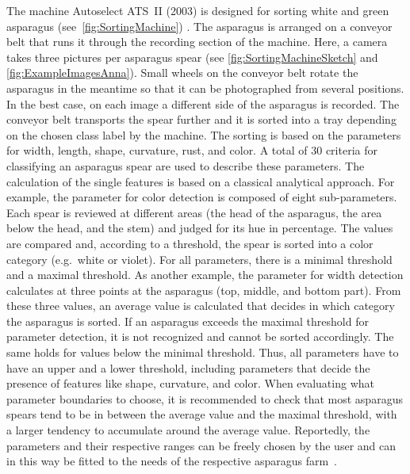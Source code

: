 The machine Autoselect ATS~II (2003) is designed for sorting white and green asparagus (see~\autoref{fig:SortingMachine}) \citep{autoselectanleitung}. The asparagus is arranged on a conveyor belt that runs it through the recording section of the machine. Here, a camera takes three pictures per asparagus spear (see \autoref{fig:SortingMachineSketch} and \autoref{fig:ExampleImagesAnna}). Small wheels on the conveyor belt rotate the asparagus in the meantime so that it can be photographed from several positions. In the best case, on each image a different side of the asparagus is recorded. The conveyor belt transports the spear further and it is sorted into a tray depending on the chosen class label by the machine. The sorting is based on the parameters for width, length, shape, curvature, rust, and color. A total of 30 criteria for classifying an asparagus spear are used to describe these parameters. The calculation of the single features is based on a classical analytical approach. For example, the parameter for color detection is composed of eight sub-parameters. Each spear is reviewed at different areas (the head of the asparagus, the area below the head, and the stem) and judged for its hue in percentage. The values are compared and, according to a threshold, the spear is sorted into a color category (e.g.\, white or violet). For all parameters, there is a minimal threshold and a maximal threshold. As another example, the parameter for width detection calculates at three points at the asparagus (top, middle, and bottom part). From these three values, an average value is calculated that decides in which category the asparagus is sorted. If an asparagus exceeds the maximal threshold for parameter detection, it is not recognized and cannot be sorted accordingly. The same holds for values below the minimal threshold. Thus, all parameters have to have an upper and a lower threshold, including parameters that decide the presence of features like shape, curvature, and color. When evaluating what parameter boundaries to choose, it is recommended to check that most asparagus spears tend to be in between the average value and the maximal threshold, with a larger tendency to accumulate around the average value. Reportedly, the parameters and their respective ranges can be freely chosen by the user and can in this way be fitted to the needs of the respective asparagus farm~\citep{autoselectanleitung}.

